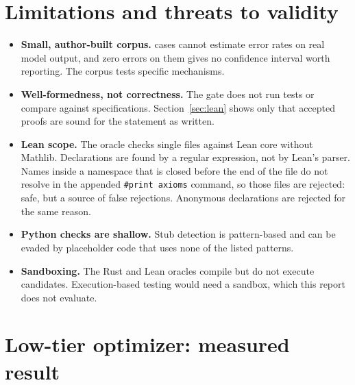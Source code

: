 \documentclass[11pt,a4paper,onecolumn]{article}
\begin{document}
\section{Limitations and threats to validity}
\begin{itemize}
\item \textbf{Small, author-built corpus.} \nTotal{} cases cannot estimate error
rates on real model output, and zero errors on them gives no confidence interval
worth reporting. The corpus tests specific mechanisms.
\item \textbf{Well-formedness, not correctness.} The gate does not run tests or
compare against specifications. Section~\ref{sec:lean} shows only that accepted
proofs are sound for the statement as written.
\item \textbf{Lean scope.} The oracle checks single files against Lean core without
Mathlib. Declarations are found by a regular expression, not by Lean's parser.
Names inside a namespace that is closed before the end of the file do not resolve
in the appended \texttt{\#print axioms} command, so those files are rejected:
safe, but a source of false rejections. Anonymous declarations are rejected for
the same reason.
\item \textbf{Python checks are shallow.} Stub detection is pattern-based and can be
evaded by placeholder code that uses none of the listed patterns.
\item \textbf{Sandboxing.} The Rust and Lean oracles compile but do not execute
candidates. Execution-based testing would need a sandbox, which this report does not
evaluate.
\end{itemize}

\section{Low-tier optimizer: measured result}
\label{sec:optimization}

\end{document}
